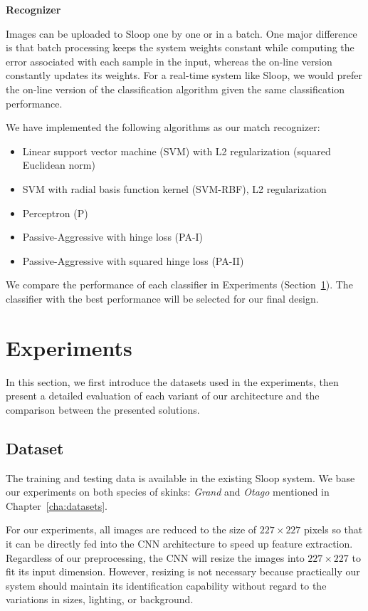 \textbf{Recognizer}

Images can be uploaded to Sloop one by one or in a batch. One major difference
is that batch processing keeps the system weights constant while computing
the error associated with each sample in the input, whereas the on-line version
constantly updates its weights. For a real-time system like Sloop, we would
prefer the on-line version of the classification algorithm given the same
classification performance.

We have implemented the following algorithms as our match recognizer:
\begin{itemize}
  \item Linear support vector machine (SVM) with L2 regularization (squared
    Euclidean norm)
  \item SVM with radial basis function kernel (SVM-RBF), L2 regularization
  \item Perceptron (P)
  \item Passive-Aggressive with hinge loss (PA-I)
  \item Passive-Aggressive with squared hinge loss (PA-II)
\end{itemize}

We compare the performance of each classifier in Experiments
(Section~\ref{sec:experiments}). The classifier with the best performance will
be selected for our final design.

\section{Experiments} %
\label{sec:experiments}

In this section, we first introduce the datasets used in the experiments, then
present a detailed evaluation of each variant of our architecture and the
comparison between the presented solutions.

\subsection{Dataset}

The training and testing data is available in the existing Sloop system. We
base our experiments on both species of skinks: \emph{Grand} and \emph{Otago}
mentioned in Chapter~\ref{cha:datasets}.

For our experiments, all images are reduced to the size of
$227 \times 227$ pixels so that it can be directly fed into the CNN
architecture to speed up feature extraction. Regardless of our preprocessing,
the CNN will resize the images into $227 \times 227$ to fit its input
dimension. However, resizing is not necessary because practically our system
should maintain its identification capability without regard to the variations
in sizes, lighting, or background.

